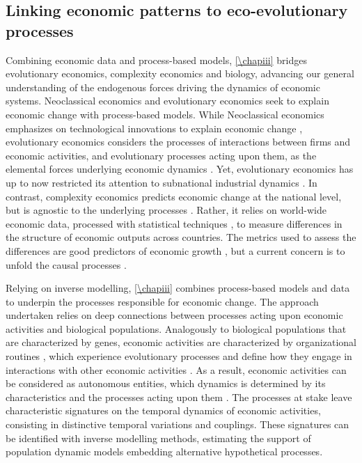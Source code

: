 \subsection{Linking economic patterns to eco-evolutionary processes}

Combining economic data and process-based models, \cref{\chapiii} bridges evolutionary economics, complexity economics and biology, advancing our general understanding of the endogenous forces driving the dynamics of economic systems.
% 
Neoclassical economics and evolutionary economics seek to explain economic change with process-based models.
% 
While Neoclassical economics emphasizes on technological innovations to explain economic change \citep{Romer1986}, evolutionary economics considers the processes of interactions between firms and economic activities, and evolutionary processes acting upon them, as the elemental forces underlying economic dynamics \citep{Metcalfe2006}. Yet, evolutionary economics has up to now restricted its attention to subnational industrial dynamics \citep{Hodgson2019}.
% 
In contrast, complexity economics \citep{Hidalgo2021} predicts economic change at the national level, but is agnostic to the underlying processes \citep{Hidalgo2021}. Rather, it relies on world-wide economic data, processed with statistical techniques \citep{Mealy2019}, to measure differences in the structure of economic outputs across countries. The metrics used to assess the differences are good predictors of economic growth \citep{Tacchella2018}, but a current concern is to unfold the causal processes \citep{Hidalgo2021}.

Relying on inverse modelling, \cref{\chapiii} combines process-based models and data to underpin the processes responsible for economic change.
% 
The approach undertaken relies on deep connections between processes acting upon economic activities and biological populations.
% 
Analogously to biological populations that are characterized by genes, economic activities are characterized by organizational routines \citep{nelson1985evolutionary}, which experience evolutionary processes and define how they engage in interactions with other economic activities \citep{nelson1985evolutionary}.
% 
As a result, economic activities can be considered as autonomous entities, which dynamics is determined by its characteristics and the processes acting upon them \citep{Boschma2005a}.
% 
The processes at stake leave characteristic signatures on the temporal dynamics of economic activities, consisting in distinctive temporal variations and couplings.
% 
These signatures can be identified with inverse modelling methods, estimating the support of population dynamic models embedding alternative hypothetical processes.

